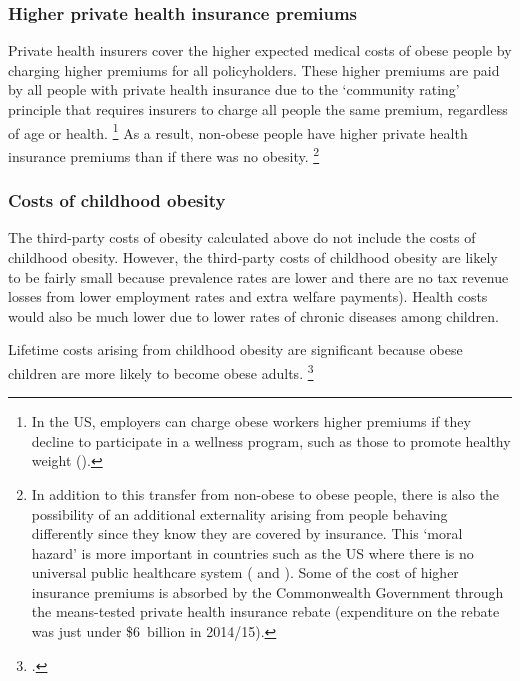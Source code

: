 \documentclass[embargoed]{grattan}
\begin{document}
\subsubsection{Higher private health insurance premiums}\label{higher-private-health-insurance-premiums}

Private health insurers cover the higher expected medical costs of obese people by charging higher premiums for all policyholders.
These higher premiums are paid by all people with private health insurance due to the `community rating' principle that requires insurers to charge all people the same premium, regardless of age or health.%
\footnote{In the US, employers can charge obese workers higher premiums if they decline to participate in a wellness program, such as those to promote healthy weight (\textcite{Karnani2016ObesityCrisisas}).} As a result, non-obese people have higher private health insurance premiums than if there was no obesity.%
\footnote{In addition to this transfer from non-obese to obese people, there is also the possibility of an additional externality arising from people behaving differently since they know they are covered by insurance.
This `moral hazard' is more important in countries such as the US where there is no universal public healthcare system (\textcite{Bhattacharya2011Whopaysobesity} and \textcite{Botkins2015DoesHealthInsurance}).
Some of the cost of higher insurance premiums is absorbed by the Commonwealth Government through the means-tested private health insurance rebate (expenditure on the rebate was just under \$6~billion in 2014/15).}

\subsubsection{Costs of childhood obesity}\label{costs-of-childhood-obesity}

The third-party costs of obesity calculated above do not include the costs of childhood obesity.
However, the third-party costs of childhood obesity are likely to be fairly small because prevalence rates are lower and there are no tax revenue losses from lower employment rates and extra welfare payments).
Health costs would also be much lower due to lower rates of chronic diseases among children.

Lifetime costs arising from childhood obesity are significant because obese children are more likely to become obese adults.%
\footcites{Health2013AustralianDietaryGuidelines}{Baker2007Childhoodbodymass}{Summerbell2005Interventionspreventingobesity}{Popkin2004nutritiontransitionworldwide}
\end{document}
